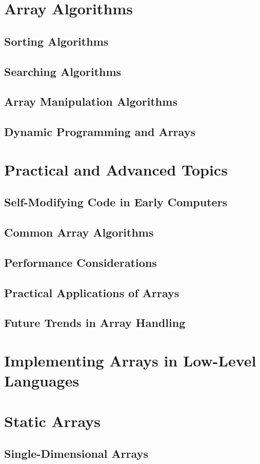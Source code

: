 \documentclass[12pt, oneside]{book}
\begin{document}
\chapter{Array Algorithms}
\section{Sorting Algorithms}
\section{Searching Algorithms}
\section{Array Manipulation Algorithms}
\section{Dynamic Programming and Arrays}
\chapter{Practical and Advanced Topics}
\section{Self-Modifying Code in Early Computers}
\section{Common Array Algorithms}
\section{Performance Considerations}
\section{Practical Applications of Arrays}
\section{Future Trends in Array Handling}
\chapter{Implementing Arrays in Low-Level Languages}
\chapter{Static Arrays}
	\section{Single-Dimensional Arrays}
\end{document}
